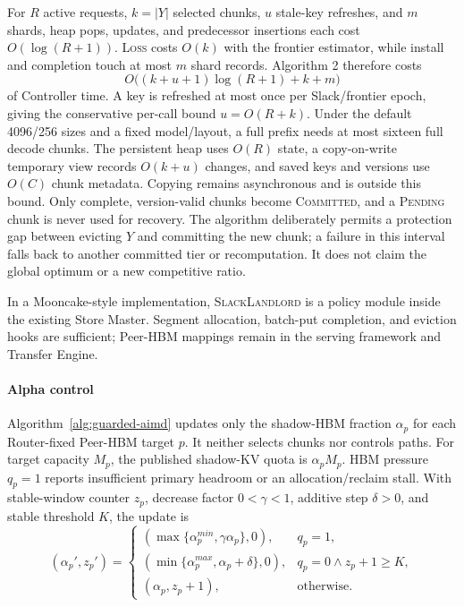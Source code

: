 For $R$ active requests, $k=|Y|$ selected chunks, $u$ stale-key refreshes, and
$m$ shards, heap pops, updates, and predecessor insertions each cost
$O(\log(R+1))$.  \textsc{Loss} costs $O(k)$ with the frontier estimator, while
install and completion touch at most $m$ shard records.  Algorithm 2 therefore
costs
\begin{equation}
 O\bigl((k+u+1)\log(R+1)+k+m\bigr)
 \label{eq:slack-landlord-cost}
\end{equation}
of Controller time.  A key is refreshed at most once per Slack/frontier epoch,
giving the conservative per-call bound $u=O(R+k)$.  Under the default 4096/256
sizes and a fixed model/layout, a full prefix needs at most sixteen full decode
chunks.  The persistent heap uses $O(R)$ state, a copy-on-write temporary view
records $O(k+u)$ changes, and saved keys and versions use $O(C)$ chunk metadata.
Copying remains asynchronous and is outside this bound.  Only complete,
version-valid chunks become
\textsc{Committed}, and a \textsc{Pending} chunk is never used for recovery.
The algorithm deliberately permits a protection gap between evicting $Y$ and
committing the new chunk; a failure in this interval falls back to another
committed tier or recomputation.  It does not claim the global optimum or a new
competitive ratio.

In a Mooncake-style implementation, \textsc{SlackLandlord} is a policy module inside
the existing Store Master.  Segment allocation, batch-put completion, and
eviction hooks are sufficient; Peer-HBM mappings remain in the serving
framework and Transfer Engine.

\paragraph{Alpha control}
Algorithm~\ref{alg:guarded-aimd} updates only the shadow-HBM fraction $\alpha_p$ for each
Router-fixed Peer-HBM target $p$.  It neither selects chunks nor controls paths.
For target capacity $M_p$, the published shadow-KV quota is $\alpha_pM_p$.
HBM pressure $q_p=1$ reports insufficient primary headroom or an
allocation/reclaim stall.  With stable-window counter $z_p$, decrease factor
$0<\gamma<1$, additive step $\delta>0$, and stable threshold $K$, the update is
\begin{equation}
 (\alpha_p',z_p')=
 \begin{cases}
 (\max\{\alpha_p^{min},\gamma\alpha_p\},0),&q_p=1,\\
 (\min\{\alpha_p^{max},\alpha_p+\delta\},0),&q_p=0\land z_p+1\ge K,\\
 (\alpha_p,z_p+1),&\text{otherwise}.
 \end{cases}
 \label{eq:guarded-aimd}
\end{equation}

